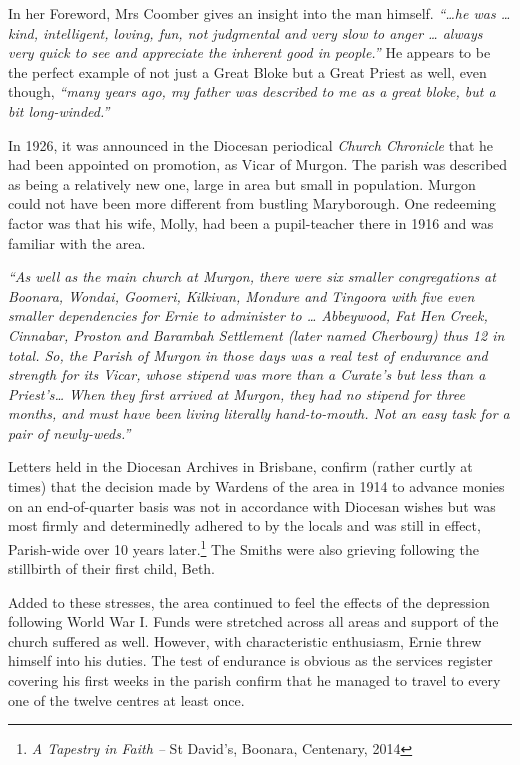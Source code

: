 In her Foreword, Mrs Coomber gives an insight into the man himself. \emph{``\ldots he was \ldots{} kind, intelligent, loving, fun, not judgmental and very slow to anger \ldots{} always very quick to see and appreciate the inherent good in people.''} He appears to be the perfect example of not just a Great Bloke but a Great Priest as well, even though, \emph{``many years ago, my father was described to me as a great bloke, but a bit long-winded.''}



In 1926, it was announced in the Diocesan periodical \emph{Church Chronicle} that he had been appointed on promotion, as Vicar of Murgon. The parish was described as being a relatively new one, large in area but small in population. Murgon could not have been more different from bustling Maryborough. One redeeming factor was that his wife, Molly, had been a pupil-teacher there in 1916 and was familiar with the area.



\emph{``As well as the main church at Murgon, there were six smaller congregations at Boonara, Wondai, Goomeri, Kilkivan, Mondure and Tingoora with five even smaller dependencies for Ernie to administer to \ldots{} Abbeywood, Fat Hen Creek, Cinnabar, Proston and Barambah Settlement (later named Cherbourg) thus 12 in total. So, the Parish of Murgon in those days was a real test of endurance and strength for its Vicar, whose stipend was more than a Curate's but less than a Priest's\ldots{} When they first arrived at Murgon, they had no stipend for three months, and must have been living literally hand-to-mouth. Not an easy task for a pair of newly-weds.''}



Letters held in the Diocesan Archives in Brisbane, confirm (rather curtly at times) that the decision made by Wardens of the area in 1914 to advance monies on an end-of-quarter basis was not in accordance with Diocesan wishes but was most firmly and determinedly adhered to by the locals and was still in effect, Parish-wide over 10 years later.\footnote{\emph{A Tapestry in Faith --} St David's, Boonara, Centenary, 2014} The Smiths were also grieving following the stillbirth of their first child, Beth.


Added to these stresses, the area continued to feel the effects of the depression following World War I. Funds were stretched across all areas and support of the church suffered as well. However, with characteristic enthusiasm, Ernie threw himself into his duties. The test of endurance is obvious as the services register covering his first weeks in the parish confirm that he managed to travel to every one of the twelve centres at least once.



